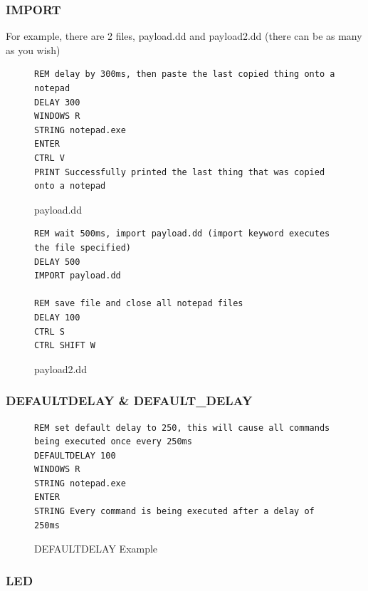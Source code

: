 \documentclass[a4paper,12pt]{article}
\begin{document}
\subsubsection{IMPORT}\label{ducky_import}
For example, there are 2 files, payload.dd and payload2.dd (there can be as many as you wish)
\begin{figure}[htb]
\begin{small}
\begin{lstlisting}[language=Ducky]
REM delay by 300ms, then paste the last copied thing onto a notepad
DELAY 300
WINDOWS R
STRING notepad.exe
ENTER
CTRL V
PRINT Successfully printed the last thing that was copied onto a notepad
\end{lstlisting}
\end{small}
\caption{payload.dd}
\end{figure}

\begin{figure}[htb]
\begin{small}
\begin{lstlisting}[language=Ducky]
REM wait 500ms, import payload.dd (import keyword executes the file specified)
DELAY 500
IMPORT payload.dd

REM save file and close all notepad files
DELAY 100
CTRL S
CTRL SHIFT W
\end{lstlisting}
\end{small}
\caption{payload2.dd}
\end{figure}


\subsubsection{DEFAULTDELAY \& DEFAULT\_DELAY}

\begin{figure}[htb]
\begin{small}
\begin{lstlisting}[language=Ducky]
REM set default delay to 250, this will cause all commands being executed once every 250ms
DEFAULTDELAY 100
WINDOWS R
STRING notepad.exe
ENTER
STRING Every command is being executed after a delay of 250ms
\end{lstlisting}
\end{small}
\caption{DEFAULTDELAY Example}
\end{figure}

\subsubsection{LED}
\end{document}
